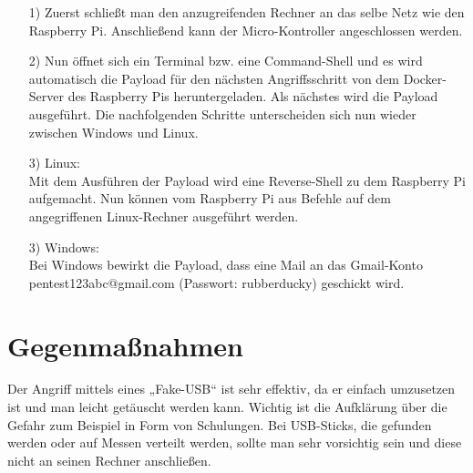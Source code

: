 \begin{enumerate}
\item[1)] Zuerst schließt man den anzugreifenden Rechner an das selbe Netz wie den Raspberry Pi. Anschließend kann der Micro-Kontroller angeschlossen werden. 

\item[2)] Nun öffnet sich ein Terminal bzw. eine Command-Shell und es wird automatisch die Payload für den nächsten Angriffsschritt von dem Docker-Server des Raspberry Pis heruntergeladen. Als nächstes wird die Payload ausgeführt. Die nachfolgenden Schritte unterscheiden sich nun wieder zwischen Windows und Linux.

\item[3)]
Linux:\\
Mit dem Ausführen der Payload wird eine Reverse-Shell zu dem Raspberry Pi aufgemacht. Nun können vom Raspberry Pi aus Befehle auf dem angegriffenen Linux-Rechner ausgeführt werden. 

\item[3)]
Windows:\\
Bei Windows bewirkt die Payload, dass eine Mail an das Gmail-Konto pentest123abc@gmail.com (Passwort: rubberducky) geschickt wird.

\end{enumerate}


\section{Gegenmaßnahmen}
Der Angriff mittels eines „Fake-USB“ ist sehr effektiv, da er einfach umzusetzen ist und man leicht getäuscht werden kann.
Wichtig ist die Aufklärung über die Gefahr zum Beispiel in Form von Schulungen. Bei USB-Sticks, die gefunden werden oder auf Messen verteilt werden, sollte man sehr vorsichtig sein und diese nicht an seinen Rechner anschließen. 














